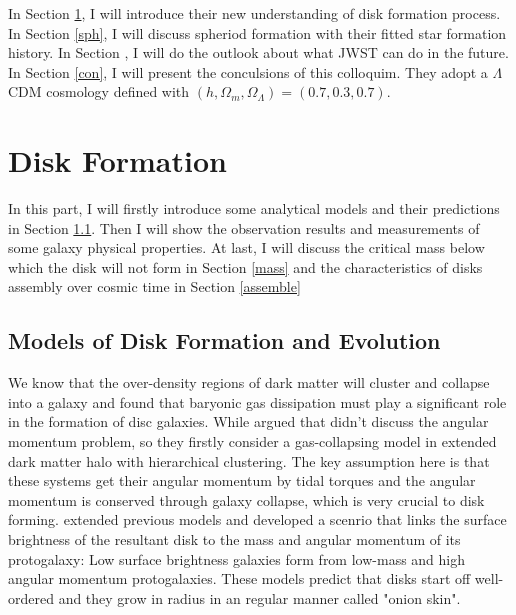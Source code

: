 \documentclass[modern]{aastex63}
\begin{document}
In Section \ref{disk}, I will introduce their new understanding of disk formation process. In Section \ref{sph}, I will discuss spheriod formation with their fitted star formation history. In Section , I will do the outlook about what JWST can do in the future. In Section \ref{con}, I will present the conculsions of this colloquim. They adopt a $\Lambda$CDM cosmology defined with $(h, \Omega_m,\Omega_{\Lambda})=(0.7, 0.3, 0.7)$.

\bigskip
\bigskip
\section{Disk Formation}\label{disk}
In this part, I will firstly introduce some analytical models and their predictions in Section \ref{model}. Then I will show the observation results and measurements of some galaxy physical properties. At last, I will discuss the critical mass below which the disk will not form in Section \ref{mass} and the characteristics of disks assembly over cosmic time in Section \ref{assemble}

\subsection{Models of Disk Formation and Evolution}\label{model}
We know that the over-density regions of dark matter will cluster and collapse into a galaxy and \citet{1978MNRAS.183..341W} found that baryonic gas dissipation must play a significant role in the formation of disc galaxies. While \citet{1980MNRAS.193..189F} argued that \citet{1978MNRAS.183..341W} didn't discuss the angular momentum problem, so they firstly consider a gas-collapsing model in extended dark matter halo with hierarchical clustering. The key assumption here is that these systems get their angular momentum by tidal torques and the angular momentum is conserved through galaxy collapse, which is very crucial to disk forming. \citet{1997ApJ...482..659D} extended previous models and developed a scenrio that links the surface brightness of the resultant disk to the mass and angular momentum of its protogalaxy: Low surface brightness galaxies form from low-mass and high angular momentum protogalaxies. These models predict that disks start off well-ordered and they grow in radius in an regular manner called "onion skin". 
\end{document}
